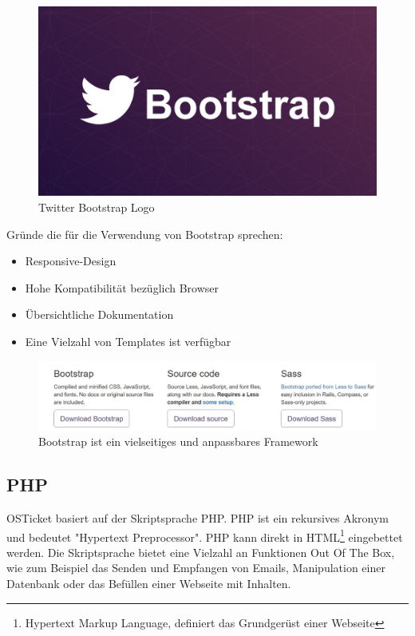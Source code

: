 	\begin{figure}[h]
		\centering
		\includegraphics[scale=0.65]{figures/twitter-bootstrap.jpg}
		\caption{Twitter Bootstrap Logo}
		\label{Bootstrap_Logo}
	\end{figure}
	
	Gründe die für die Verwendung von Bootstrap sprechen:
	\begin{itemize}
		\item Responsive-Design
		\item Hohe Kompatibilität bezüglich Browser
		\item Übersichtliche Dokumentation 
		\item Eine Vielzahl von Templates ist verfügbar
	\end{itemize}
\begin{figure}[h]
	\centering
	\includegraphics[scale=0.7]{figures/bootstrap.jpg}
	\caption{Bootstrap ist ein vielseitiges und anpassbares Framework}
	\label{Bootstrap Page Screenshot}
\end{figure}
	\subsection{PHP}
	OSTicket basiert auf der Skriptsprache PHP. PHP ist ein rekursives Akronym und bedeutet "Hypertext Preprocessor". PHP kann direkt in HTML\footnote{Hypertext Markup Language, definiert das Grundgerüst einer Webseite} eingebettet werden. Die Skriptsprache bietet eine Vielzahl an Funktionen Out Of The Box, wie zum Beispiel das Senden und Empfangen von Emails, Manipulation einer Datenbank oder das Befüllen einer Webseite mit Inhalten.
	
